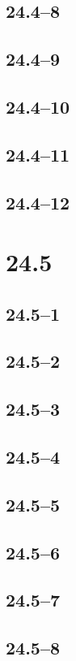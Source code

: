 \documentclass{article}
\begin{document}
\subsection{24.4--8}
\subsection{24.4--9}
\subsection{24.4--10}
\subsection{24.4--11}
\subsection{24.4--12}

\section*{24.5}
\subsection{24.5--1}
\subsection{24.5--2}
\subsection{24.5--3}
\subsection{24.5--4}
\subsection{24.5--5}
\subsection{24.5--6}
\subsection{24.5--7}
\subsection{24.5--8}
\end{document}
